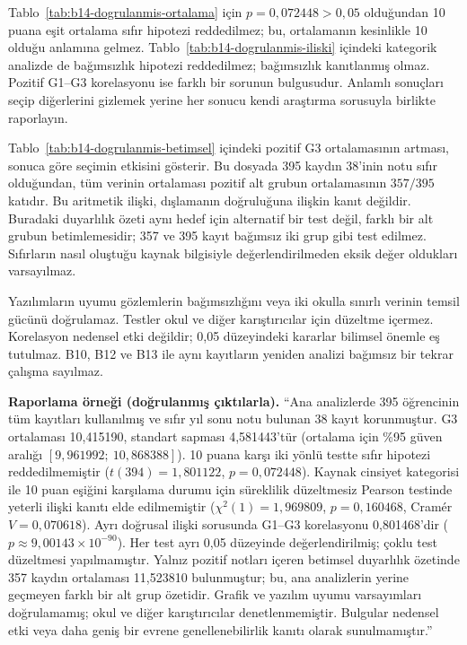 \begin{outputguidebox}
Tablo~\ref{tab:b14-dogrulanmis-ortalama} için $p=0{,}072448>0{,}05$
olduğundan 10 puana eşit ortalama sıfır hipotezi reddedilmez;
bu, ortalamanın kesinlikle 10 olduğu anlamına gelmez.
Tablo~\ref{tab:b14-dogrulanmis-iliski} içindeki kategorik analizde
de bağımsızlık hipotezi reddedilmez; bağımsızlık kanıtlanmış olmaz.
Pozitif G1--G3 korelasyonu ise farklı bir sorunun bulgusudur.
Anlamlı sonuçları seçip diğerlerini gizlemek yerine her sonucu
kendi araştırma sorusuyla birlikte raporlayın.

Tablo~\ref{tab:b14-dogrulanmis-betimsel} içindeki pozitif G3
ortalamasının artması, sonuca göre seçimin etkisini gösterir.
Bu dosyada 395 kaydın 38'inin notu sıfır olduğundan, tüm verinin
ortalaması pozitif alt grubun ortalamasının $357/395$ katıdır.
Bu aritmetik ilişki, dışlamanın doğruluğuna ilişkin kanıt değildir.
Buradaki duyarlılık özeti aynı hedef için alternatif bir test
değil, farklı bir alt grubun betimlemesidir; 357 ve 395 kayıt
bağımsız iki grup gibi test edilmez. Sıfırların nasıl oluştuğu
kaynak bilgisiyle değerlendirilmeden eksik değer oldukları varsayılmaz.

Yazılımların uyumu gözlemlerin bağımsızlığını veya iki okulla
sınırlı verinin temsil gücünü doğrulamaz. Testler okul ve diğer
karıştırıcılar için düzeltme içermez. Korelasyon nedensel etki
değildir; 0,05 düzeyindeki kararlar bilimsel önemle eş tutulmaz.
B10, B12 ve B13 ile aynı kayıtların yeniden analizi bağımsız
bir tekrar çalışma sayılmaz.
\end{outputguidebox}

\textbf{Raporlama örneği (doğrulanmış çıktılarla).}
``Ana analizlerde 395 öğrencinin tüm kayıtları kullanılmış ve
sıfır yıl sonu notu bulunan 38 kayıt korunmuştur. G3 ortalaması
10,415190, standart sapması 4,581443'tür (ortalama için \%95 güven
aralığı $[9{,}961992;\ 10{,}868388]$). 10 puana karşı iki yönlü
testte sıfır hipotezi reddedilmemiştir
($t(394)=1{,}801122$, $p=0{,}072448$). Kaynak cinsiyet kategorisi
ile 10 puan eşiğini karşılama durumu için süreklilik düzeltmesiz
Pearson testinde yeterli ilişki kanıtı elde edilmemiştir
($\chi^2(1)=1{,}969809$, $p=0{,}160468$, Cramér $V=0{,}070618$).
Ayrı doğrusal ilişki sorusunda G1--G3 korelasyonu 0,801468'dir
($p\approx9{,}00143\times10^{-90}$). Her test ayrı 0,05 düzeyinde
değerlendirilmiş; çoklu test düzeltmesi yapılmamıştır.
Yalnız pozitif notları içeren betimsel duyarlılık özetinde
357 kaydın ortalaması 11,523810 bulunmuştur; bu, ana analizlerin
yerine geçmeyen farklı bir alt grup özetidir. Grafik ve yazılım
uyumu varsayımları doğrulamamış; okul ve diğer karıştırıcılar
denetlenmemiştir. Bulgular nedensel etki veya daha geniş bir evrene
genellenebilirlik kanıtı olarak sunulmamıştır.''

